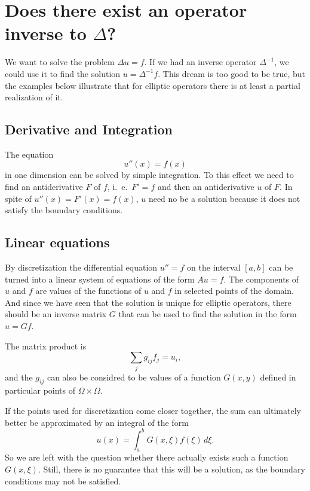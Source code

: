 %
%
%
\section{Does there exist an operator inverse to $\Delta$?}
We want to solve the problem $\Delta u=f$.
If we had an inverse operator $\Delta^{-1}$, we could use it to
find the solution $u=\Delta^{-1}f$.
This dream is too good to be true, but the examples below 
illustrate that for elliptic operators there is at least a partial
realization of it.

\subsection{Derivative and Integration}
The equation 
\[
u''(x)=f(x)
\]
in one dimension can be solved by simple integration.
To this effect we need to find an antiderivative $F$ of $f$, i.~e.~$F'=f$
and then an antiderivative $u$ of $F$.
In spite of $u''(x)=F'(x)=f(x)$, $u$ need no be a solution because
it does not satisfy the boundary conditions.

\subsection{Linear equations}
By discretization the differential equation $u''=f$ on the interval
$[a,b]$ can be turned into a linear system of equations of
the form $Au=f$.
The components of $u$ and $f$ are values of the functions of $u$ and $f$
in selected points of the domain.
And since we have seen that the solution is unique for elliptic operators,
there should be an inverse matrix $G$ that can be used to find the
solution in the form $u=Gf$.

The matrix product is
\[
\sum_{j}g_{ij}f_j = u_i,
\]
and the $g_{ij}$ can also be considred to be values of a function $G(x,y)$
defined in particular points of $\Omega\times\Omega$.

If the points used for discretization come closer together, the sum
can ultimately better be approximated by an integral of the form
\[
u(x)=\int_a^b G(x,\xi)f(\xi)\,d\xi.
\]
So we are left with the question whether there actually exists such
a function $G(x,\xi)$.
Still, there is no guarantee that this will be a solution, as
the boundary conditions may not be satisfied.

